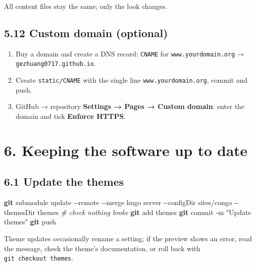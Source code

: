 \documentclass[
  10pt,
]{article}
\newenvironment{Shaded}{\begin{snugshade}}{\end{snugshade}}
\newcommand{\AttributeTok}[1]{\textcolor[rgb]{0.13,0.29,0.53}{#1}}
\newcommand{\CommentTok}[1]{\textcolor[rgb]{0.56,0.35,0.01}{\textit{#1}}}
\newcommand{\ExtensionTok}[1]{#1}
\newcommand{\FunctionTok}[1]{\textcolor[rgb]{0.13,0.29,0.53}{\textbf{#1}}}
\newcommand{\NormalTok}[1]{#1}
\newcommand{\StringTok}[1]{\textcolor[rgb]{0.31,0.60,0.02}{#1}}
\providecommand{\tightlist}{%
  \setlength{\itemsep}{0pt}\setlength{\parskip}{0pt}}
\begin{document}
All content files stay the same; only the look changes.

\hypertarget{custom-domain-optional}{%
\subsection{5.12 Custom domain
(optional)}\label{custom-domain-optional}}

\begin{enumerate}
\def\labelenumi{\arabic{enumi}.}
\tightlist
\item
  Buy a domain and create a DNS record: \texttt{CNAME} for
  \texttt{www.yourdomain.org} → \texttt{gezhuang0717.github.io}.
\item
  Create \texttt{static/CNAME} with the single line
  \texttt{www.yourdomain.org}, commit and push.
\item
  GitHub → repository \textbf{Settings → Pages → Custom domain}: enter
  the domain and tick \textbf{Enforce HTTPS}.
\end{enumerate}

\hypertarget{keeping-the-software-up-to-date}{%
\section{6. Keeping the software up to
date}\label{keeping-the-software-up-to-date}}

\hypertarget{update-the-themes}{%
\subsection{6.1 Update the themes}\label{update-the-themes}}

\begin{Shaded}
\begin{Highlighting}[]
\FunctionTok{git}\NormalTok{ submodule update }\AttributeTok{{-}{-}remote} \AttributeTok{{-}{-}merge}
\ExtensionTok{hugo}\NormalTok{ server }\AttributeTok{{-}{-}configDir}\NormalTok{ sites/congo }\AttributeTok{{-}{-}themesDir}\NormalTok{ themes   }\CommentTok{\# check nothing broke}
\FunctionTok{git}\NormalTok{ add themes}
\FunctionTok{git}\NormalTok{ commit }\AttributeTok{{-}m} \StringTok{"Update themes"}
\FunctionTok{git}\NormalTok{ push}
\end{Highlighting}
\end{Shaded}

Theme updates occasionally rename a setting; if the preview shows an
error, read the message, check the theme's documentation, or roll back
with \texttt{git\ checkout\ themes}.
\end{document}
